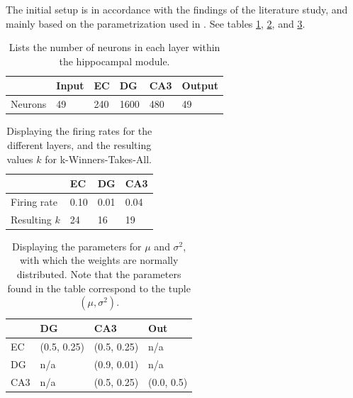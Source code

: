 The initial setup is in accordance with the findings of the literature study, and mainly based on the parametrization used in \citep{Hattori2010, Hattori2014, Wakagi2008}. See tables \ref{table:number_of_neurons}, \ref{table:firing_rates}, and \ref{table:initial_weight_distributions}.

\begin{table}
\centering
\caption{Lists the number of neurons in each layer within the hippocampal module.}
\label{table:number_of_neurons}
\begin{tabular}{l|l|l|l|l|l|}
\cline{2-6}
                              & Input & EC  & DG   & CA3 & Output \\ \hline
\multicolumn{1}{|l|}{Neurons} & 49    & 240 & 1600 & 480 & 49     \\ \hline
\end{tabular}
\end{table}

\begin{table}
\centering
\caption{Displaying the firing rates for the different layers, and the resulting values $k$ for k-Winners-Takes-All.}
\label{table:firing_rates}
\begin{tabular}{l|l|l|l|}
\cline{2-4}
                                  & EC   & DG   & CA3  \\ \hline
\multicolumn{1}{|l|}{Firing rate} & 0.10 & 0.01 & 0.04 \\ \hline
\multicolumn{1}{|l|}{Resulting $k$} & 24 & 16 & 19 \\ \hline
\end{tabular}
\end{table}

\begin{table}[]
\centering
\caption{Displaying the parameters for $\mu$ and $\sigma^2$, with which the weights are normally distributed. Note that the parameters found in the table correspond to the tuple $(\mu, \sigma^2)$.}
\label{table:initial_weight_distributions}
\begin{tabular}{l|l|l|l|}
\cline{2-4}
                          & DG        & CA3       & Out      \\ \hline
\multicolumn{1}{|l|}{EC}  & (0.5, 0.25) & (0.5, 0.25) & n/a      \\ \hline
\multicolumn{1}{|l|}{DG}  & n/a       & (0.9, 0.01) & n/a      \\ \hline
\multicolumn{1}{|l|}{CA3} & n/a       & (0.5, 0.25) & (0.0, 0.5) \\ \hline
\end{tabular}
\end{table}

